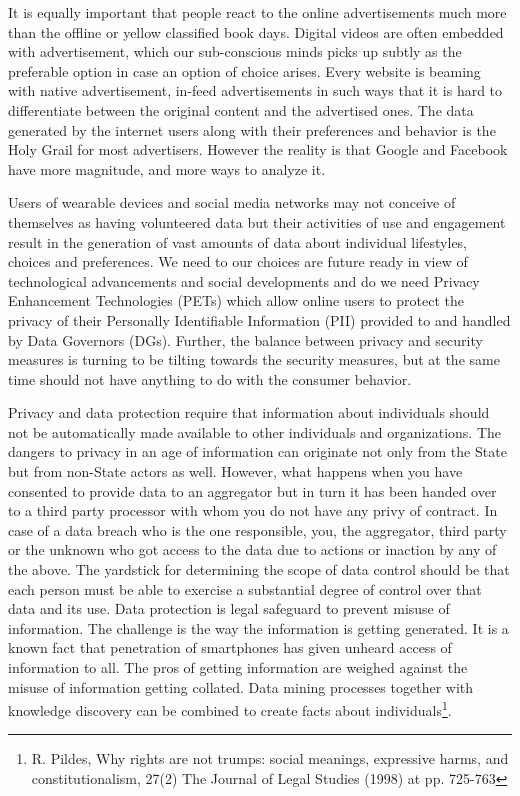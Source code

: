 \begin{multicols}{2}
It is equally important that people react to the online advertisements much more than the offline or yellow classified book days. Digital videos are often embedded with advertisement, which our sub-conscious minds picks up subtly as the preferable option in case an option of choice arises. Every website is beaming with native advertisement, in-feed advertisements in such ways that it is hard to differentiate between the original content and the advertised ones. The data generated by the internet users along with their preferences and behavior is the Holy Grail for most advertisers. However the reality is that Google and Facebook have more magnitude, and more ways to analyze it. 

Users of wearable devices and social media networks may not conceive of themselves as having volunteered data but their activities of use and engagement result in the generation of vast amounts of data about individual lifestyles, choices and preferences. We need to our choices are future ready in view of technological advancements and social developments and do we need Privacy Enhancement Technologies (PETs) which allow online users to protect the privacy of their Personally Identifiable Information (PII) provided to and handled by Data Governors (DGs). Further, the balance between privacy and security measures is turning to be tilting towards the security measures, but at the same time should not have anything to do with the consumer behavior.

Privacy and data protection require that information about individuals should not be automatically made available to other individuals and organizations. The dangers to privacy in an age of information can originate not only from the State but from non-State actors as well. However, what happens when you have consented to provide data to an aggregator but in turn it has been handed over to a third party processor with whom you do not have any privy of contract. In case of a data breach who is the one responsible, you, the aggregator, third party or the unknown who got access to the data due to actions or inaction by any of the above. The yardstick for determining the scope of data control should be that each person must be able to exercise a substantial degree of control over that data and its use. Data protection is legal safeguard to prevent misuse of information. The challenge is the way the information is getting generated. It is a known fact that penetration of smartphones has given unheard access of information to all. The pros of getting information are weighed against the misuse of information getting collated. Data mining processes together with knowledge discovery can be combined to create facts about individuals\footnote{R. Pildes, Why rights are not trumps: social meanings, expressive harms, and constitutionalism, 27(2) The Journal of Legal Studies (1998) at pp. 725-763}. 


\end{multicols}
